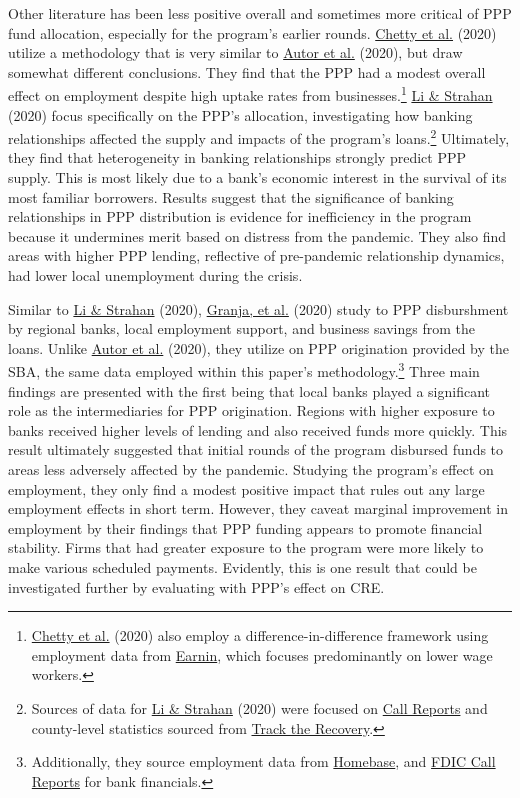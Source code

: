 \documentclass[11pt]{article} %
\begin{document}
Other literature has been less positive overall and sometimes more critical of PPP fund allocation, especially for the program's earlier rounds. \hyperlink{Chetty}{Chetty et al.} (2020) utilize a methodology that is very similar to \hyperlink{Autor}{Autor et al.} (2020), but draw somewhat different conclusions. They find that the PPP had a modest overall effect on employment despite high uptake rates from businesses.\footnote{\hyperlink{Chetty}{Chetty et al.} (2020) also employ a difference-in-difference framework using employment data from \href{https://www.earnin.com/}{Earnin}, which focuses predominantly on lower wage workers.} \hyperlink{Li}{Li \& Strahan} (2020) focus specifically on the PPP's allocation, investigating how banking relationships affected the supply and impacts of the program's loans.\footnote{ Sources of data for \hyperlink{Li}{Li \& Strahan} (2020) were focused on \href{https://www.fdic.gov/regulations/resources/call/call.html}{Call Reports} and county-level statistics sourced from \href{https://tracktherecovery.org/}{Track the Recovery}.} Ultimately, they find that heterogeneity in banking relationships strongly predict PPP supply. This is most likely due to a bank's economic interest in the survival of its most familiar borrowers. Results suggest that the significance of banking relationships in PPP distribution is evidence for inefficiency in the program because it undermines merit based on distress from the pandemic. They also find areas with higher PPP lending, reflective of pre-pandemic relationship dynamics, had lower local unemployment during the crisis.

Similar to \hyperlink{Li}{Li \& Strahan} (2020), \hyperlink{Granja}{Granja, et al.} (2020) study to PPP disburshment by regional banks, local employment support, and business savings from the loans. Unlike \hyperlink{Autor}{Autor et al.} (2020), they utilize on PPP origination provided by the SBA, the same data employed within this paper's methodology.\footnote{Additionally, they source employment data from \href{https://app.joinhomebase.com/accounts/sign-in}{Homebase}, and \href{https://www.fdic.gov/regulations/resources/call/call.html}{FDIC Call Reports} for bank financials.} Three main findings are presented with the first being that local banks played a significant role as the intermediaries for PPP origination. Regions with higher exposure to banks received higher levels of lending and also received funds more quickly. This result ultimately suggested that initial rounds of the program disbursed funds to areas less adversely affected by the pandemic. Studying the program's effect on employment, they only find a modest positive impact that rules out any large employment effects in short term. However, they caveat marginal improvement in employment by their findings that PPP funding appears to promote financial stability. Firms that had greater exposure to the program were more likely to make various scheduled payments. Evidently, this is one result that could be investigated further by evaluating with PPP's effect on CRE.
\end{document}
